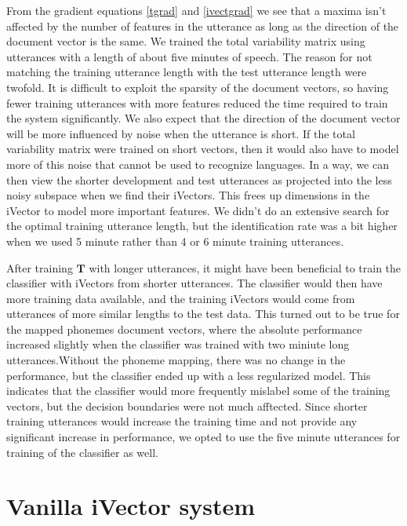 From the gradient equations \ref{tgrad} and \ref{ivectgrad} we see that a maxima isn't affected by the number of features in the utterance as long as the direction of the document vector is the same. We trained the total variability matrix using utterances with a length of about five minutes of speech. The reason for not matching the training utterance length with the test utterance length were twofold. It is difficult to exploit the sparsity of the document vectors, so having fewer training utterances with more features reduced the time required to train the system significantly. We also expect that the direction of the document vector will be more influenced by noise when the utterance is short. If the total variability matrix were trained on short vectors, then it would also have to model more of this noise that cannot be used to recognize languages. In a way, we can then view the shorter development and test utterances as projected into the less noisy subspace when we find their iVectors. This frees up dimensions in the iVector to model more important features. We didn't do an extensive search for the optimal training utterance length, but the identification rate was a bit higher when we used 5 minute rather than 4 or 6 minute training utterances.

After training $\mathbf{T}$ with longer utterances, it might have been beneficial to train the classifier with iVectors from shorter utterances. The classifier would then have more training data available, and the training iVectors would come from utterances of more similar lengths to the test data. This turned out to be true for the mapped phonemes document vectors, where the absolute performance increased slightly when the classifier was trained with two miniute long utterances.Without the phoneme mapping, there was no change in the performance, but the classifier ended up with a less regularized model. This indicates that the classifier would more frequently mislabel some of the training vectors, but the decision boundaries were not much afftected. Since shorter training utterances would increase the training time and not provide any significant increase in performance, we opted to use the five minute utterances for training of the classifier as well.


\section{Vanilla iVector system}
\label{sect:vanillaivect}

